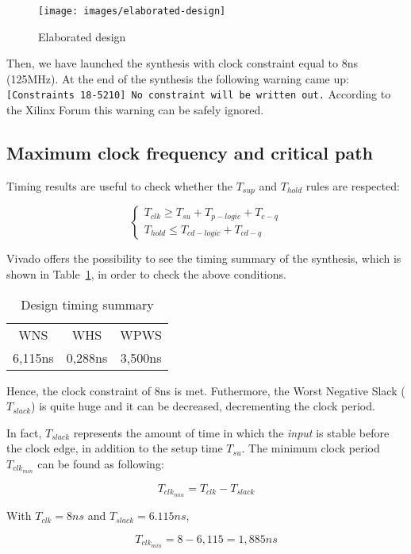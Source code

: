 \documentclass[11pt,a4paper,oneside, openright]{article}
\begin{document}
\begin{figure}[h]
    \centering
    \texttt{[image: images/elaborated-design]}
    \caption{Elaborated design}
    \label{fig:elaborated-design}
\end{figure}

Then, we have launched the synthesis with clock constraint equal to 8ns (125MHz). At the end of the synthesis the following warning came up: \texttt{[Constraints 18-5210] No constraint will be written out.} According to the Xilinx Forum this warning can be safely ignored.

\subsection{Maximum clock frequency and critical path}
Timing results are useful to check whether the $ T_{sup} $ and $ T_{hold} $ rules are respected:

$$ \begin{cases} T_{clk} \geq T_{su} + T_{p-logic} + T_{c-q} \\ T_{hold} \leq T_{cd-logic} + T_{cd-q} \end{cases} $$

Vivado offers the possibility to see the timing summary of the synthesis, which is shown in Table~\ref{tab:timing}, in order to check the above conditions.

\begin{table}[h]
    \centering
    \begin{tabular}{c c c}
        WNS & WHS & WPWS \\
        6,115ns & 0,288ns & 3,500ns
    \end{tabular}
    \caption{Design timing summary}
    \label{tab:timing}
\end{table}

Hence, the clock constraint of 8ns is met. Futhermore, the Worst Negative Slack ($T_{slack}$) is quite huge and it can be decreased, decrementing the clock period.

In fact, $T_{slack}$ represents the amount of time in which the \textit{input} is stable before the clock edge, in addition to the setup time $T_{su}$. The minimum clock period $T_{clk_{min}}$ can be found as following:

$$ T_{clk_{min}} = T_{clk} - T_{slack} $$

With $ T_{clk} = 8ns $ and $ T_{slack} = 6.115ns $, 

$$ T_{clk_{min}} = 8 - 6,115 = 1,885ns $$
\end{document}
